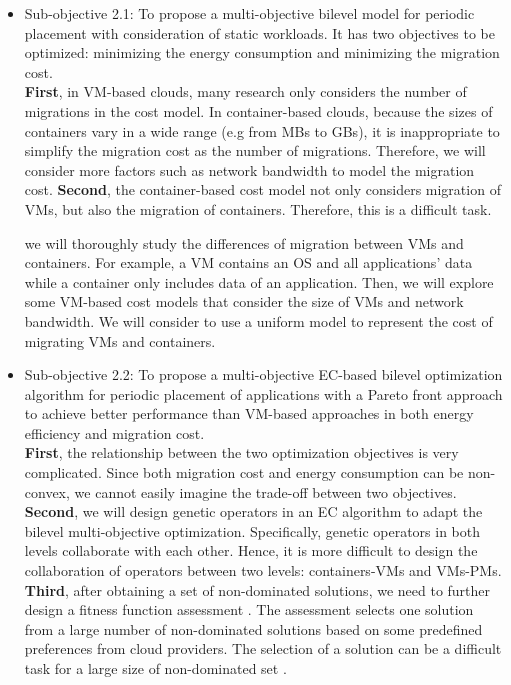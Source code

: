 \begin{itemize}
	\item Sub-objective 2.1: To propose a multi-objective bilevel model for periodic placement with consideration of static workloads.  It has two objectives to be optimized: minimizing the energy consumption and minimizing the migration cost. \\

	\textbf{First}, in VM-based clouds, many research only considers the number of migrations \cite{Murtazaev:2014eo} in the cost model. In container-based clouds, because the sizes of containers vary in a wide range (e.g from MBs to GBs), it is inappropriate to simplify the migration cost as the number of migrations. Therefore, we will consider more factors such as network bandwidth to model the migration cost. \textbf{Second}, the container-based cost model not only considers migration of VMs, but also the migration of containers. Therefore, this is a difficult task.

	 we will thoroughly study the differences of migration between VMs and containers. For example, a VM contains an OS and all applications' data while a container only includes data of an application. Then, we will explore some VM-based cost models that consider the size of VMs and network bandwidth. We will consider to use a uniform model to represent the  cost of migrating VMs and containers.



	\item Sub-objective 2.2: To propose a multi-objective EC-based bilevel optimization algorithm for periodic placement of applications with a Pareto front approach to achieve better performance than VM-based approaches in both energy efficiency and migration cost.\\

	 \textbf{First}, the relationship between the two optimization objectives is very complicated. Since both migration cost and energy consumption can be non-convex, we cannot easily imagine the trade-off between two objectives. \textbf{Second}, we will design genetic operators in an EC algorithm to adapt the bilevel multi-objective optimization. Specifically, genetic operators in both levels collaborate with each other. Hence, it is more difficult to design the collaboration of operators between two levels: containers-VMs and VMs-PMs.  \textbf{Third}, after obtaining a set of non-dominated solutions, we need to further design a fitness function assessment \cite{Moritz:2015hv}. The assessment selects one solution from a large number of non-dominated solutions based on some predefined preferences from cloud providers. The selection of a solution can be a difficult task for a large size of non-dominated set \cite{Zio:2012jz}. 


\end{itemize}
